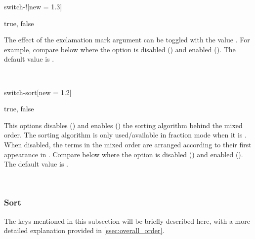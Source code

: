 \begin{option}{switch-!}[new = 1.3]
	\begin{values}[default = false]
		true, false
	\end{values}
	The effect of the exclamation mark argument can be toggled with the value .
	For example, compare below where the option is disabled () and enabled (). The default value is .
	\begin{example}
		 \\
	\end{example}
\end{option}

\begin{option}{switch-sort}[new = 1.2]
	\begin{values}[default = true]
		true, false
	\end{values}
	This options disables () and enables () the sorting algorithm behind the mixed order. The sorting algorithm is only used/available in fraction mode when it is . When disabled, the terms in the mixed order are arranged according to their first appearance in . Compare below where the option is disabled () and enabled (). The default value is \val{\default}.
	\begin{example}
		\pdv[switch-sort=false, order={a+b,2kn-d,2-2b}]{f}{x,y,z} \\
		\pdv[switch-sort=true, order={a+b,2kn-d,2-2b}]{f}{x,y,z}
	\end{example}
\end{option}

\subsubsection*{Sort}
The keys mentioned in this subsection will be briefly described here, with a more detailed explanation provided in \cref{ssec:overall_order}.

